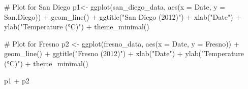 \documentclass[
  11pt,
]{article}
\newenvironment{Shaded}{\begin{snugshade}}{\end{snugshade}}
\newcommand{\AttributeTok}[1]{\textcolor[rgb]{0.40,0.45,0.13}{#1}}
\newcommand{\CommentTok}[1]{\textcolor[rgb]{0.37,0.37,0.37}{#1}}
\newcommand{\FunctionTok}[1]{\textcolor[rgb]{0.28,0.35,0.67}{#1}}
\newcommand{\NormalTok}[1]{\textcolor[rgb]{0.00,0.23,0.31}{#1}}
\newcommand{\OtherTok}[1]{\textcolor[rgb]{0.00,0.23,0.31}{#1}}
\newcommand{\SpecialCharTok}[1]{\textcolor[rgb]{0.37,0.37,0.37}{#1}}
\newcommand{\StringTok}[1]{\textcolor[rgb]{0.13,0.47,0.30}{#1}}
\begin{document}
\begin{Shaded}
\end{Shaded}

\begin{Shaded}
\begin{Highlighting}[]
\CommentTok{\# Plot for San Diego}
\NormalTok{p1}\OtherTok{\textless{}{-}} \FunctionTok{ggplot}\NormalTok{(san\_diego\_data, }\FunctionTok{aes}\NormalTok{(}\AttributeTok{x =}\NormalTok{ Date, }\AttributeTok{y =}\NormalTok{ San.Diego)) }\SpecialCharTok{+}
  \FunctionTok{geom\_line}\NormalTok{() }\SpecialCharTok{+}
  \FunctionTok{ggtitle}\NormalTok{(}\StringTok{"San Diego (2012)"}\NormalTok{) }\SpecialCharTok{+}
  \FunctionTok{xlab}\NormalTok{(}\StringTok{"Date"}\NormalTok{) }\SpecialCharTok{+} \FunctionTok{ylab}\NormalTok{(}\StringTok{"Temperature (°C)"}\NormalTok{) }\SpecialCharTok{+}
  \FunctionTok{theme\_minimal}\NormalTok{()}

\CommentTok{\# Plot for Fresno}
\NormalTok{p2 }\OtherTok{\textless{}{-}} \FunctionTok{ggplot}\NormalTok{(fresno\_data, }\FunctionTok{aes}\NormalTok{(}\AttributeTok{x =}\NormalTok{ Date, }\AttributeTok{y =}\NormalTok{ Fresno)) }\SpecialCharTok{+}
  \FunctionTok{geom\_line}\NormalTok{() }\SpecialCharTok{+}
  \FunctionTok{ggtitle}\NormalTok{(}\StringTok{"Fresno (2012)"}\NormalTok{) }\SpecialCharTok{+}
  \FunctionTok{xlab}\NormalTok{(}\StringTok{"Date"}\NormalTok{) }\SpecialCharTok{+} \FunctionTok{ylab}\NormalTok{(}\StringTok{"Temperature (°C)"}\NormalTok{) }\SpecialCharTok{+}
  \FunctionTok{theme\_minimal}\NormalTok{()}

\NormalTok{p1 }\SpecialCharTok{+}\NormalTok{ p2}
\end{Highlighting}
\end{Shaded}
\end{document}
